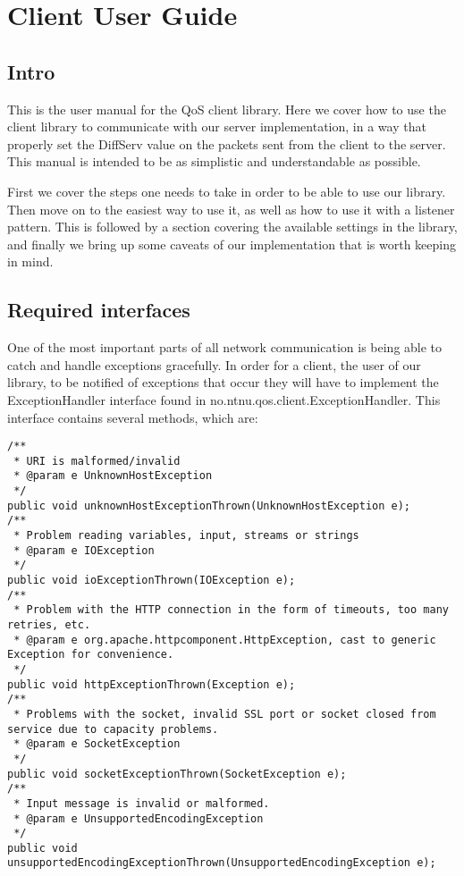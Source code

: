 \section{Client User Guide}\label{Client User Guide} 
    
    \subsection{Intro}\label{userguideIntro}
    
    This is the user manual for the QoS client library. Here we cover how to use the client library to communicate with our server implementation, in a way that properly set the DiffServ value on the packets sent from the client to the server. This manual is intended to be as simplistic and understandable as possible.

    First we cover the steps one needs to take in order to be able to use our library. Then move on to the easiest way to use it, as well as how to use it with a listener pattern. This is followed by a section covering the available settings in the library, and finally we bring up some caveats of our implementation that is worth keeping in mind.

    \subsection{Required interfaces}\label{userguideReqiredInterfaces}
    
    One of the most important parts of all network communication is being able to catch and handle exceptions gracefully. In order for a client, the user of our library, to be notified of exceptions that occur they will have to implement the ExceptionHandler interface found in no.ntnu.qos.client.ExceptionHandler. This interface contains several methods, which are:

\lstset{language=java, style=eclipse}
\lstset{frame=single}
\lstset{breaklines=true}
\begin{lstlisting}[caption={ExceptionHandler interface}, label=userguideExceptionHandler]
/**
 * URI is malformed/invalid
 * @param e UnknownHostException
 */
public void unknownHostExceptionThrown(UnknownHostException e);
/**
 * Problem reading variables, input, streams or strings
 * @param e IOException
 */
public void ioExceptionThrown(IOException e);
/**
 * Problem with the HTTP connection in the form of timeouts, too many retries, etc.
 * @param e org.apache.httpcomponent.HttpException, cast to generic Exception for convenience.
 */
public void httpExceptionThrown(Exception e);
/**
 * Problems with the socket, invalid SSL port or socket closed from service due to capacity problems.
 * @param e SocketException
 */
public void socketExceptionThrown(SocketException e);
/**
 * Input message is invalid or malformed.
 * @param e UnsupportedEncodingException
 */
public void unsupportedEncodingExceptionThrown(UnsupportedEncodingException e);
\end{lstlisting}

